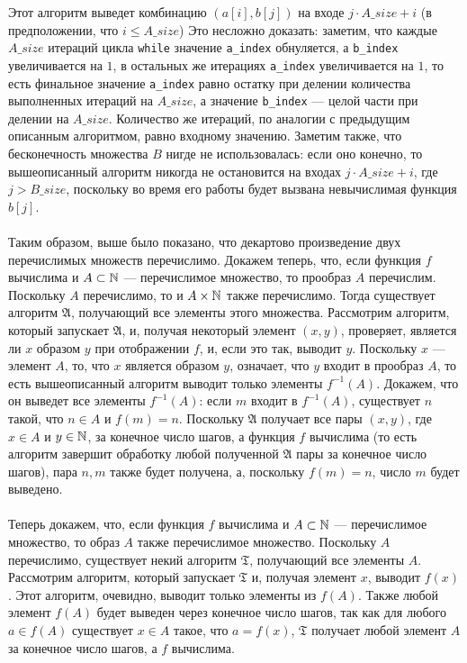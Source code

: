 \documentclass[a4paper,12pt]{article}
\newcommand {\gu} [1] {\guillemotleft#1\guillemotright}
\begin{document}
	Этот алгоритм выведет комбинацию $(a[i], b[j])$ на входе $j\cdot A\_size + i$ (в предположении, что $i\leqslant A\_size$) Это несложно доказать: заметим, что каждые $A\_size$ итераций цикла \texttt{while} значение \texttt{a\_index} обнуляется, а \texttt{b\_index} увеличивается на $1$, в остальных же итерациях \texttt{a\_index} увеличивается на $1$, то есть финальное значение \texttt{a\_index} равно остатку при делении количества выполненных итераций на $A\_size$, а значение \texttt{b\_index} --- целой части при делении на $A\_size$. Количество же итераций, по аналогии с предыдущим описанным алгоритмом, равно входному значению. Заметим также, что бесконечность множества $B$ нигде не использовалась: если оно конечно, то вышеописанный алгоритм никогда не остановится на входах $j\cdot A\_size + i$, где $j > B\_size$, поскольку во время его работы будет вызвана невычислимая функция $b[j]$.\\\\
	Таким образом, выше было показано, что декартово произведение двух перечислимых множеств перечислимо. Докажем теперь, что, если функция $f$ вычислима и $A \subset \mathbb{N}$ --- перечислимое множество, то прообраз $A$ перечислим. Поскольку $A$ перечислимо, то и $A \times \mathbb{N}$ также перечислимо. Тогда существует алгоритм $\mathfrak{A}$, получающий все элементы этого множества. Рассмотрим алгоритм, который запускает $\mathfrak{A}$, и, получая некоторый элемент $(x, y)$, проверяет, является ли $x$ образом $y$ при отображении $f$, и, если это так, выводит $y$. Поскольку $x$ --- элемент $A$, то, что $x$ является образом $y$, означает, что $y$ входит в прообраз $A$, то есть вышеописанный алгоритм выводит только элементы $f^{-1}(A)$. Докажем, что он выведет все элементы $f^{-1}(A)$: если $m$ входит в $f^{-1}(A)$, существует $n$ такой, что $n\in A$ и $f(m)=n$. Поскольку $\mathfrak{A}$ получает все пары $(x, y)$, где $x \in A$ и $y \in \mathbb{N}$, за конечное число шагов, а функция $f$ вычислима (то есть алгоритм завершит \gu{обработку} любой полученной $\mathfrak{A}$ пары за конечное число шагов), пара $n, m$ также будет получена, а, поскольку $f(m)=n$, число $m$ будет выведено.\\\\
	Теперь докажем, что, если функция $f$ вычислима и $A \subset \mathbb{N}$ --- перечислимое множество, то образ $A$ также перечислимое множество. Поскольку $A$ перечислимо, существует некий алгоритм $\mathfrak{T}$, получающий все элементы $A$. Рассмотрим алгоритм, который запускает $\mathfrak{T}$ и, получая элемент $x$, выводит $f(x)$. Этот алгоритм, очевидно, выводит только элементы из $f(A)$. Также любой элемент $f(A)$ будет выведен через конечное число шагов, так как для любого $a\in f(A)$ существует $x\in A$ такое, что $a=f(x)$, $\mathfrak{T}$ получает любой элемент $A$ за конечное число шагов, а $f$ вычислима.
	
\end{document}
